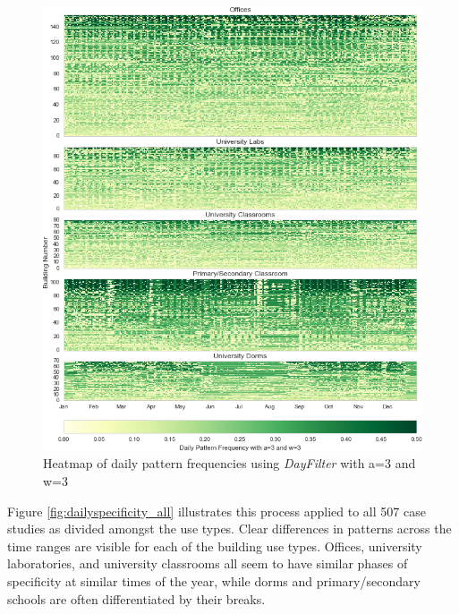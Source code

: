 \begin{figure}[ht!]
\begin{center}
\includegraphics[width=1\columnwidth]{figures/dayfilter_heatmap/dayfilter_heatmap}
\caption{Heatmap of daily pattern frequencies using \emph{DayFilter} with a=3 and w=3
\label{fig:dayfilter_all}%
}
\end{center}
\end{figure}

Figure \ref{fig:dailyspecificity_all} illustrates this process applied to all 507 case studies as divided amongst the use types. Clear differences in patterns across the time ranges are visible for each of the building use types. Offices, university laboratories, and university classrooms all seem to have similar phases of specificity at similar times of the year, while dorms and primary/secondary schools are often differentiated by their breaks.

